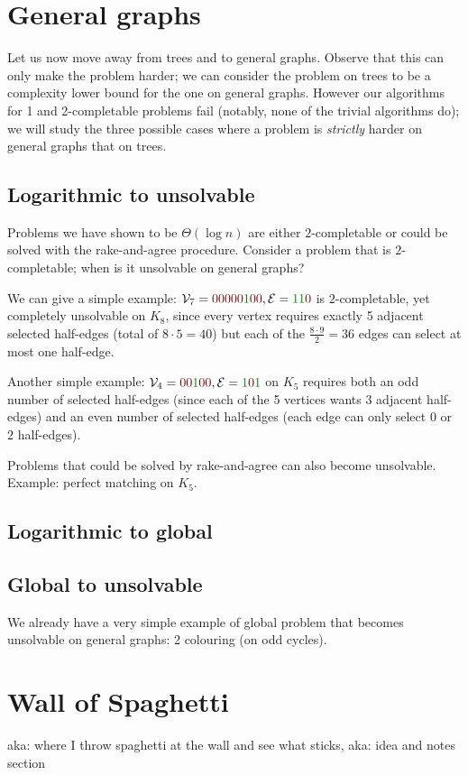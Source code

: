 \documentclass[12pt,a4paper]{article}
\begin{document}
\section{General graphs}
Let us now move away from trees and to general graphs. Observe that this can only make the problem harder; we can consider the problem on trees to be a complexity lower bound for the one on general graphs. However our algorithms for 1 and 2-completable problems fail (notably, none of the trivial algorithms do); we will study the three possible cases where a problem is \emph{strictly} harder on general graphs that on trees. %
\subsection{Logarithmic to unsolvable}
Problems we have shown to be $\Theta(\log n)$ are either $2$-completable or could be solved with the rake-and-agree procedure. Consider a problem that is $2$-completable; when is it unsolvable on general graphs?

We can give a simple example: $\Vc_7=\n\n\n\n\n\y\n\n,\Ec=\y\y\n$ is $2$-completable, yet completely unsolvable on $K_8$, since every vertex requires exactly 5 adjacent selected half-edges (total of $8\cdot 5=40$) but each of the $\frac{8\cdot9}{2}=36$ edges can select at most one half-edge.

Another simple example: $\Vc_4=\n\n\y\n\n,\Ec=\y\n\y$ on $K_5$ requires both an odd number of selected half-edges (since each of the 5 vertices wants 3 adjacent half-edges) and an even number of selected half-edges (each edge can only select $0$ or $2$ half-edges).

Problems that could be solved by rake-and-agree can also become unsolvable. Example: perfect matching on $K_5$.
\subsection{Logarithmic to global}

\subsection{Global to unsolvable}
We already have a very simple example of global problem that becomes unsolvable on general graphs: 2 colouring (on odd cycles).


\section{Wall of Spaghetti}
aka: where I throw spaghetti at the wall and see what sticks, aka: idea and notes section
\end{document}
